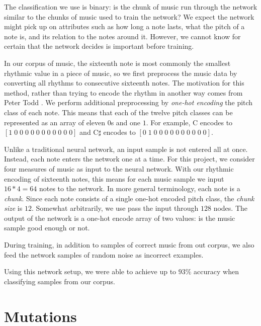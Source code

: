 The classification we use is binary: is the chunk of music run through the network similar to the chunks of music used to train the network?
We expect the network might pick up on attributes such as how long a note lasts, what the pitch of a note is, and its relation to the notes around it.
However, we cannot know for certain that the network decides is important before training.

In our corpus of music, the sixteenth note is most commonly the smallest rhythmic value in a piece of music, so we first preprocess the music data by converting all rhythms to consecutive sixteenth notes.
The motivation for this method, rather than trying to encode the rhythm in another way comes from Peter Todd \cite{todd_connectionist_1989}.
We perform additional preprocessing by \textit{one-hot encoding} the pitch class of each note.
This means that each of the twelve pitch classes can be represented as an array of eleven $0$s and one $1$.
For example, C encodes to $[1 \; 0 \; 0 \; 0 \; 0 \; 0 \; 0 \; 0 \; 0 \; 0 \; 0 \; 0]$ and C$\sharp$ encodes to $[0 \; 1 \; 0 \; 0 \; 0 \; 0 \; 0 \; 0 \; 0 \; 0 \; 0 \; 0]$.

Unlike a traditional neural network, an input sample is not entered all at once.
Instead, each note enters the network one at a time.
For this project, we consider four measures of music as input to the neural network.
With our rhythmic encoding of sixteenth notes, this means for each music sample we input $16 * 4 = 64$ notes to the network.
In more general terminology, each note is a \textit{chunk}.
Since each note consists of a single one-hot encoded pitch class, the \textit{chunk size} is $12$.
Somewhat arbitrarily, we use pass the input through $128$ nodes.
The output of the network is a one-hot encode array of two values: is the music sample good enough or not.

During training, in addition to samples of correct music from out corpus, we also feed the network samples of random noise as incorrect examples.

Using this network setup, we were able to achieve up to $93\%$ accuracy when classifying samples from our corpus.

\section{Mutations} \label{ga:mutate}

